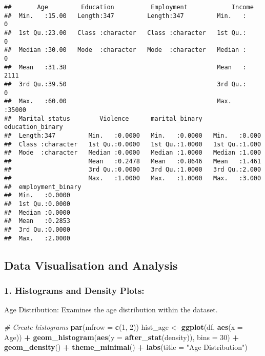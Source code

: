 \documentclass[
]{article}
\newenvironment{Shaded}{\begin{snugshade}}{\end{snugshade}}
\newcommand{\AttributeTok}[1]{\textcolor[rgb]{0.13,0.29,0.53}{#1}}
\newcommand{\CommentTok}[1]{\textcolor[rgb]{0.56,0.35,0.01}{\textit{#1}}}
\newcommand{\DecValTok}[1]{\textcolor[rgb]{0.00,0.00,0.81}{#1}}
\newcommand{\FunctionTok}[1]{\textcolor[rgb]{0.13,0.29,0.53}{\textbf{#1}}}
\newcommand{\NormalTok}[1]{#1}
\newcommand{\OtherTok}[1]{\textcolor[rgb]{0.56,0.35,0.01}{#1}}
\newcommand{\SpecialCharTok}[1]{\textcolor[rgb]{0.81,0.36,0.00}{\textbf{#1}}}
\newcommand{\StringTok}[1]{\textcolor[rgb]{0.31,0.60,0.02}{#1}}
\begin{document}
\begin{verbatim}
##       Age         Education          Employment            Income     
##  Min.   :15.00   Length:347         Length:347         Min.   :    0  
##  1st Qu.:23.00   Class :character   Class :character   1st Qu.:    0  
##  Median :30.00   Mode  :character   Mode  :character   Median :    0  
##  Mean   :31.38                                         Mean   : 2111  
##  3rd Qu.:39.50                                         3rd Qu.:    0  
##  Max.   :60.00                                         Max.   :35000  
##  Marital_status        Violence      marital_binary   education_binary
##  Length:347         Min.   :0.0000   Min.   :0.0000   Min.   :0.000   
##  Class :character   1st Qu.:0.0000   1st Qu.:1.0000   1st Qu.:1.000   
##  Mode  :character   Median :0.0000   Median :1.0000   Median :1.000   
##                     Mean   :0.2478   Mean   :0.8646   Mean   :1.461   
##                     3rd Qu.:0.0000   3rd Qu.:1.0000   3rd Qu.:2.000   
##                     Max.   :1.0000   Max.   :1.0000   Max.   :3.000   
##  employment_binary
##  Min.   :0.0000   
##  1st Qu.:0.0000   
##  Median :0.0000   
##  Mean   :0.2853   
##  3rd Qu.:0.0000   
##  Max.   :2.0000
\end{verbatim}

\hypertarget{data-visualisation-and-analysis}{%
\subsection{Data Visualisation and
Analysis}\label{data-visualisation-and-analysis}}

\hypertarget{histograms-and-density-plots}{%
\subsubsection{1. Histograms and Density
Plots:}\label{histograms-and-density-plots}}

Age Distribution: Examines the age distribution within the dataset.

\begin{Shaded}
\begin{Highlighting}[]
\CommentTok{\# Create histograms}
\FunctionTok{par}\NormalTok{(}\AttributeTok{mfrow =} \FunctionTok{c}\NormalTok{(}\DecValTok{1}\NormalTok{, }\DecValTok{2}\NormalTok{))}
\NormalTok{hist\_age }\OtherTok{\textless{}{-}} \FunctionTok{ggplot}\NormalTok{(df, }\FunctionTok{aes}\NormalTok{(}\AttributeTok{x =}\NormalTok{ Age)) }\SpecialCharTok{+}
  \FunctionTok{geom\_histogram}\NormalTok{(}\FunctionTok{aes}\NormalTok{(}\AttributeTok{y =} \FunctionTok{after\_stat}\NormalTok{(density)), }\AttributeTok{bins =} \DecValTok{30}\NormalTok{) }\SpecialCharTok{+}
  \FunctionTok{geom\_density}\NormalTok{() }\SpecialCharTok{+}
  \FunctionTok{theme\_minimal}\NormalTok{() }\SpecialCharTok{+}
  \FunctionTok{labs}\NormalTok{(}\AttributeTok{title =} \StringTok{"Age Distribution"}\NormalTok{)}
\end{Highlighting}
\end{Shaded}
\end{document}
